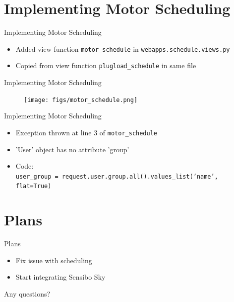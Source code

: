\documentclass{beamer}
\begin{document}
\section{Implementing Motor Scheduling}
\begin{frame}{Implementing Motor Scheduling}
\begin{itemize}
\item Added view function \texttt{motor\_schedule} in \texttt{webapps.schedule.views.py} 
\item Copied from view function \texttt{plugload\_schedule} in same file
\end{itemize}
\end{frame}

\begin{frame}{Implementing Motor Scheduling}
\begin{figure}
\texttt{[image: figs/motor\_schedule.png]}
\end{figure}
\end{frame}

\begin{frame}{Implementing Motor Scheduling}
\begin{itemize}
\item Exception thrown at line 3 of \texttt{motor\_schedule}
\item 'User' object has no attribute 'group'
\item Code: \\\texttt{user\_group = request.user.group.all().values\_list('name', flat=True)}
\end{itemize}
\end{frame}

\section{Plans}
\begin{frame}{Plans}
\begin{itemize}
\item Fix issue with scheduling
\item Start integrating Sensibo Sky
\end{itemize}
\end{frame}

\begin{frame}
\centering
\Huge
Any questions?
\end{frame}
\end{document}
